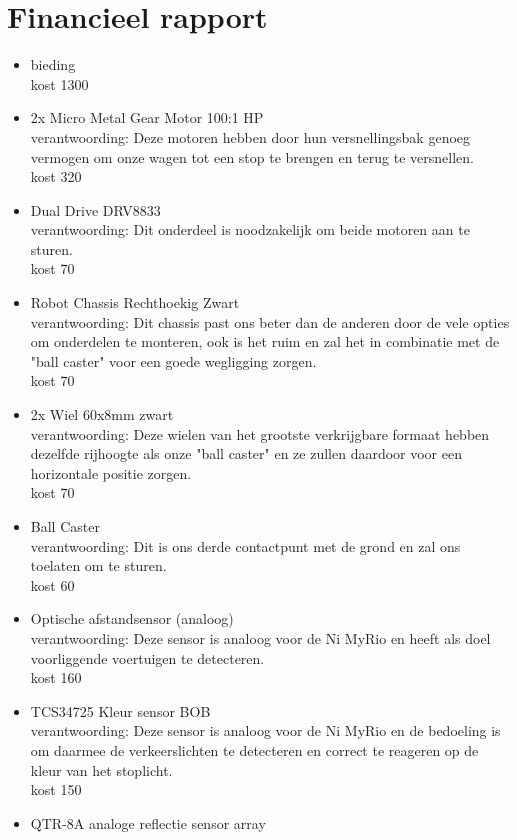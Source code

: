 \documentclass[12pt]{article}
\begin{document}
\section*{Financieel rapport}

\begin{itemize}
	\item bieding\\
	kost 1300
	\item 2x Micro Metal Gear Motor 100:1 HP\\
	verantwoording: Deze motoren hebben door hun versnellingsbak genoeg vermogen om onze wagen tot een stop te brengen en terug te versnellen.\\
	kost 320
	\item Dual Drive DRV8833\\
	verantwoording: Dit onderdeel is noodzakelijk om beide motoren aan te sturen.\\
	kost 70
	\item Robot Chassis Rechthoekig Zwart\\
	verantwoording: Dit chassis past ons beter dan de anderen door de vele opties om onderdelen te monteren, ook is het ruim en zal het in combinatie met de "ball caster" voor een goede wegligging zorgen.\\
	kost 70
	\item 2x Wiel 60x8mm zwart\\
	verantwoording: Deze wielen van het grootste verkrijgbare formaat hebben dezelfde rijhoogte als onze "ball caster" en ze zullen daardoor voor een horizontale positie zorgen.\\
	kost 70
	\item Ball Caster\\
	verantwoording: Dit is ons derde contactpunt met de grond en zal ons toelaten om te sturen.\\
	kost 60
	\item Optische afstandsensor (analoog)\\
	verantwoording: Deze sensor is analoog voor de Ni MyRio en heeft als doel voorliggende voertuigen te detecteren.\\
	kost 160
	\item TCS34725 Kleur sensor BOB \\
	verantwoording: Deze sensor is analoog voor de Ni MyRio en de bedoeling is om daarmee de verkeerslichten te detecteren en correct te reageren op de kleur van het stoplicht.\\
	kost 150
	\item QTR-8A analoge reflectie sensor array\\

\end{itemize}
\end{document}
